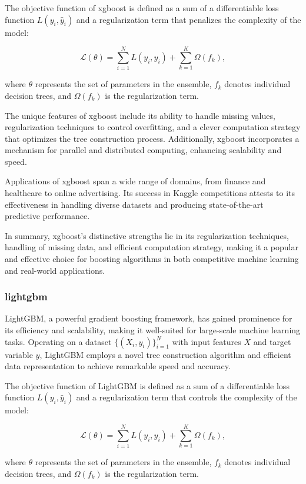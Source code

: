 \documentclass[twocolumn]{article}
\begin{document}
The objective function of xgboost is defined as a sum of a differentiable loss function \(L(y_i, \hat{y}_i)\) and a regularization term that penalizes the complexity of the model:

\[ \mathcal{L}(\theta) = \sum_{i=1}^{N} L(y_i, \hat{y}_i) + \sum_{k=1}^{K} \Omega(f_k), \]

where \(\theta\) represents the set of parameters in the ensemble, \(f_k\) denotes individual decision trees, and \(\Omega(f_k)\) is the regularization term.

The unique features of xgboost include its ability to handle missing values, regularization techniques to control overfitting, and a clever computation strategy that optimizes the tree construction process. Additionally, xgboost incorporates a mechanism for parallel and distributed computing, enhancing scalability and speed.

Applications of xgboost span a wide range of domains, from finance and healthcare to online advertising. Its success in Kaggle competitions attests to its effectiveness in handling diverse datasets and producing state-of-the-art predictive performance.

In summary, xgboost's distinctive strengths lie in its regularization techniques, handling of missing data, and efficient computation strategy, making it a popular and effective choice for boosting algorithms in both competitive machine learning and real-world applications.

		\subsubsection{lightgbm}
LightGBM, a powerful gradient boosting framework, has gained prominence for its efficiency and scalability, making it well-suited for large-scale machine learning tasks. Operating on a dataset \(\{(X_i, y_i)\}_{i=1}^{N}\) with input features \(X\) and target variable \(y\), LightGBM employs a novel tree construction algorithm and efficient data representation to achieve remarkable speed and accuracy.

The objective function of LightGBM is defined as a sum of a differentiable loss function \(L(y_i, \hat{y}_i)\) and a regularization term that controls the complexity of the model:

\[ \mathcal{L}(\theta) = \sum_{i=1}^{N} L(y_i, \hat{y}_i) + \sum_{k=1}^{K} \Omega(f_k), \]

where \(\theta\) represents the set of parameters in the ensemble, \(f_k\) denotes individual decision trees, and \(\Omega(f_k)\) is the regularization term.
\end{document}
